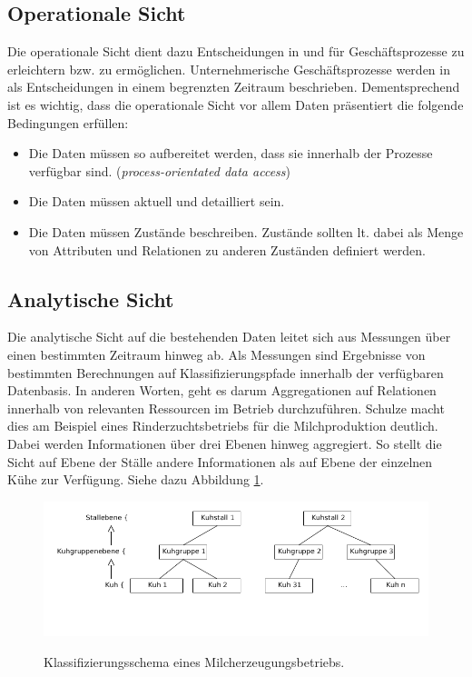 \subsection{Operationale Sicht}
Die operationale Sicht dient dazu Entscheidungen in und für Geschäftsprozesse zu erleichtern bzw. zu ermöglichen. Unternehmerische Geschäftsprozesse werden in \cite{jour:Schulze2007} als Entscheidungen in einem begrenzten Zeitraum beschrieben. Dementsprechend ist es wichtig, dass die operationale Sicht vor allem Daten präsentiert die folgende Bedingungen erfüllen:

\begin{itemize}
	\item Die Daten müssen so aufbereitet werden, dass sie innerhalb der Prozesse verfügbar sind. (\textit{process-orientated data access})
	\item Die Daten müssen aktuell und detailliert sein.
	\item Die Daten müssen Zustände beschreiben. Zustände sollten lt. \cite{jour:Schulze2007} dabei als Menge von Attributen und Relationen zu anderen Zuständen definiert werden.
\end{itemize}

\subsection{Analytische Sicht}
Die analytische Sicht auf die bestehenden Daten leitet sich aus Messungen über einen bestimmten Zeitraum hinweg ab. Als Messungen sind Ergebnisse von bestimmten Berechnungen auf Klassifizierungspfade innerhalb der verfügbaren Datenbasis. In anderen Worten, geht es darum Aggregationen auf Relationen innerhalb von relevanten Ressourcen im Betrieb durchzuführen. Schulze macht dies am Beispiel eines Rinderzuchtsbetriebs für die Milchproduktion deutlich. Dabei werden Informationen über drei Ebenen hinweg aggregiert. So stellt die Sicht auf Ebene der Ställe andere Informationen als auf Ebene der einzelnen Kühe zur Verfügung. Siehe dazu Abbildung \ref{fig:kuehe}. 

\begin{figure}[h]
 \includegraphics[scale=0.5,natwidth=\textwidth]{figures/datamodelling/kuehe.png}
 \centering
 \label{fig:kuehe}
 \caption{Klassifizierungsschema eines Milcherzeugungsbetriebs.}
\end{figure}

